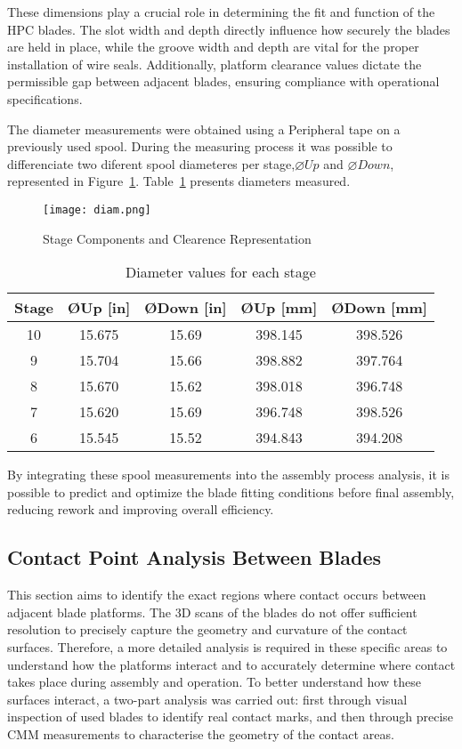 These dimensions play a crucial role in determining the fit and function of the HPC blades. The slot width and depth directly influence how securely the blades are held in place, while the groove width and depth are vital for the proper installation of wire seals.
Additionally, platform clearance values dictate the permissible gap between adjacent blades, ensuring compliance with operational specifications.

The diameter measurements were obtained using a Peripheral tape on a previously used spool. 
During the measuring process it was possible to differenciate two diferent spool diameteres per stage,$\varnothing Up$ and $\varnothing Down$, represented in Figure~\ref{fig:diam.png}.
Table~\ref{tab:diameters} presents diameters measured.

\begin{figure}[H]
    \centering
    \texttt{[image: diam.png]}
    \caption{Stage Components and Clearence Representation}
    \label{fig:diam.png}
\end{figure}


\begin{table}[h]
    \centering
    \begin{tabular}{|c|c|c|c|c|}
        \hline
        Stage & ØUp [in] & ØDown [in] & ØUp [mm] & ØDown [mm]\\
        \hline
        10 & 15.675 & 15.69 & 398.145 & 398.526 \\
        9  & 15.704 & 15.66 & 398.882 & 397.764 \\
        8  & 15.670 & 15.62 & 398.018 & 396.748 \\
        7  & 15.620 & 15.69 & 396.748 & 398.526 \\
        6  & 15.545 & 15.52 & 394.843 & 394.208 \\
        \hline
    \end{tabular}
    \caption{Diameter values for each stage}
    \label{tab:diameters}
\end{table}

By integrating these spool measurements into the assembly process analysis, it is possible to predict and optimize the blade fitting conditions before final assembly, reducing rework and improving overall efficiency.

\subsection{Contact Point Analysis Between Blades}
\label{cha:contacto}
This section aims to identify the exact regions where contact occurs between adjacent blade platforms. The 3D scans of the blades do not offer sufficient resolution to precisely capture the geometry and curvature of the contact surfaces. Therefore, a more detailed analysis is required in these specific areas to understand how the platforms interact and to accurately determine where contact takes place during assembly and operation.
To better understand how these surfaces interact, a two-part analysis was carried out: first through visual inspection of used blades to identify real contact marks, and then through precise CMM measurements to characterise the geometry of the contact areas.

